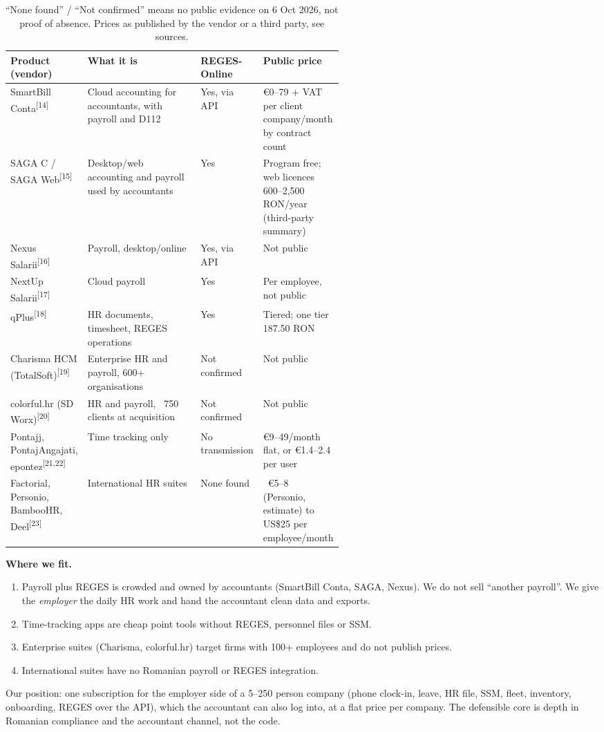 \documentclass[10pt,a4paper]{article}
\newcommand{\src}[1]{\textsuperscript{\textcolor{brandSlate}{[#1]}}}
\begin{document}
\begin{table}[H]
\centering\footnotesize
\begin{tabularx}{\linewidth}{@{}P{0.20\linewidth}LP{0.12\linewidth}P{0.24\linewidth}@{}}
\toprule
\textbf{Product (vendor)} & \textbf{What it is} & \textbf{REGES-Online} & \textbf{Public price} \\
\midrule
SmartBill Conta\src{14} & Cloud accounting for accountants, with payroll and D112 & Yes, via API & €0--79 + VAT per client company/month by contract count \\
SAGA C / SAGA Web\src{15} & Desktop/web accounting and payroll used by accountants & Yes & Program free; web licences 600--2,500 RON/year (third-party summary) \\
Nexus Salarii\src{16} & Payroll, desktop/online & Yes, via API & Not public \\
NextUp Salarii\src{17} & Cloud payroll & Yes & Per employee, not public \\
qPlus\src{18} & HR documents, timesheet, REGES operations & Yes & Tiered; one tier 187.50 RON \\
Charisma HCM (TotalSoft)\src{19} & Enterprise HR and payroll, 600+ organisations & Not confirmed & Not public \\
colorful.hr (SD Worx)\src{20} & HR and payroll, ~750 clients at acquisition & Not confirmed & Not public \\
Pontajj, PontajAngajati, epontez\src{21,22} & Time tracking only & No transmission & €9--49/month flat, or €1.4--2.4 per user \\
Factorial, Personio, BambooHR, Deel\src{23} & International HR suites & None found & ~€5--8 (Personio, estimate) to US\$25 per employee/month \\
\bottomrule
\end{tabularx}
\caption*{\footnotesize\color{brandSlate}``None found'' / ``Not confirmed'' means no public evidence
on 6 Oct 2026, not proof of absence. Prices as published by the vendor or a third party, see sources.}
\end{table}

\textbf{Where we fit.}
\begin{enumerate}[leftmargin=1.6em]
\item Payroll plus REGES is crowded and owned by accountants (SmartBill Conta, SAGA, Nexus). We do
  not sell ``another payroll''. We give the \emph{employer} the daily HR work and hand the accountant
  clean data and exports.
\item Time-tracking apps are cheap point tools without REGES, personnel files or SSM.
\item Enterprise suites (Charisma, colorful.hr) target firms with 100+ employees and do not publish
  prices.
\item International suites have no Romanian payroll or REGES integration.
\end{enumerate}
Our position: one subscription for the employer side of a 5--250 person company (phone clock-in,
leave, HR file, SSM, fleet, inventory, onboarding, REGES over the API), which the accountant can
also log into, at a flat price per company. The defensible core is depth in Romanian compliance
and the accountant channel, not the code.
\end{document}
